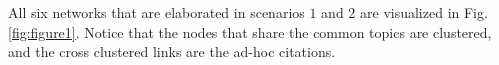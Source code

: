 \documentclass[AMS,STIX1COL]{WileyNJD-v2}
\DeclarePairedDelimiter\floor{\lfloor}{\rfloor}
\begin{document}
{All six networks that are elaborated in scenarios $1$ and $2$ are visualized in Fig.\ref{fig:figure1}.
Notice that the nodes that share the common topics are clustered,
and the cross clustered links are the ad-hoc citations.






}
\end{document}

